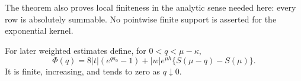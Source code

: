 The theorem also proves local finiteness in the analytic sense needed here:
every row is absolutely summable.  No pointwise finite support is asserted for
the exponential kernel.

For later weighted estimates define, for $0<q<\mu-\kappa$,
\begin{equation}
 \Phi(q)=8|t|(e^{qa_0}-1)
 +|w|e^{\mu h}\{S(\mu-q)-S(\mu)\}.
 \label{eq:r7-Phi}
\end{equation}
It is finite, increasing, and tends to zero as $q\downarrow0$.

